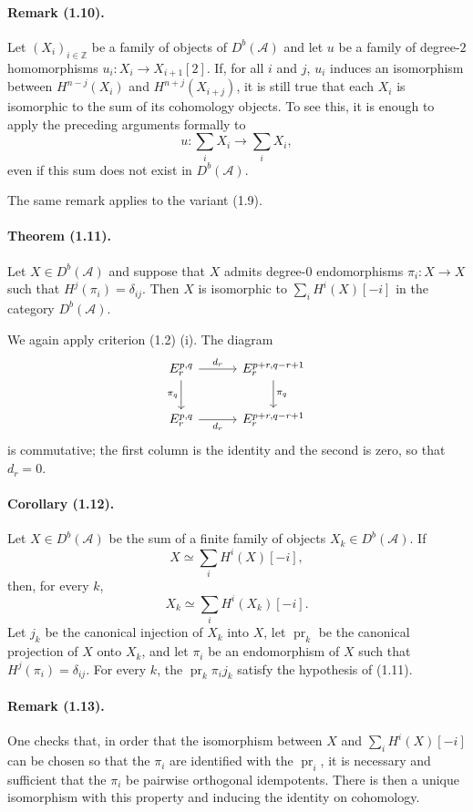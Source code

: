 \documentclass[10pt]{article}
\newcommand{\Acal}{\mathcal A}
\newcommand{\Z}{\mathbb Z}
\newcommand{\Db}{D^b}
\newcommand{\pr}{\operatorname{pr}}
\begin{document}
\paragraph{Remark (1.10).} Let $(X_i)_{i\in\Z}$ be a family of objects of $\Db(\Acal)$ and let $u$ be a family of degree-$2$ homomorphisms $u_i:X_i\to X_{i+1}[2]$. If, for all $i$ and $j$, $u_i$ induces an isomorphism between $H^{n-j}(X_i)$ and $H^{n+j}(X_{i+j})$, it is still true that each $X_i$ is isomorphic to the sum of its cohomology objects. To see this, it is enough to apply the preceding arguments formally to
\[
u:\sum_iX_i\longrightarrow\sum_iX_i,
\]
even if this sum does not exist in $\Db(\Acal)$.

The same remark applies to the variant (1.9).

\paragraph{Theorem (1.11).} Let $X\in\Db(\Acal)$ and suppose that $X$ admits degree-$0$ endomorphisms $\pi_i:X\to X$ such that $H^j(\pi_i)=\delta_{ij}$. Then $X$ is isomorphic to $\sum_iH^i(X)[-i]$ in the category $\Db(\Acal)$.

We again apply criterion (1.2) (i). The diagram
\[
\begin{tikzcd}[column sep=3.0em,row sep=2.2em]
E_r^{p,q} \arrow[r,"d_r"] \arrow[d,"\pi_q"'] & E_r^{p+r,q-r+1} \arrow[d,"\pi_q"]\\
E_r^{p,q} \arrow[r,"d_r"'] & E_r^{p+r,q-r+1}
\end{tikzcd}
\]
is commutative; the first column is the identity and the second is zero, so that $d_r=0$.

\paragraph{Corollary (1.12).} Let $X\in\Db(\Acal)$ be the sum of a finite family of objects $X_k\in\Db(\Acal)$. If
\[
X\simeq\sum_iH^i(X)[-i],
\]
then, for every $k$,
\[
X_k\simeq\sum_iH^i(X_k)[-i].
\]
Let $j_k$ be the canonical injection of $X_k$ into $X$, let $\pr_k$ be the canonical projection of $X$ onto $X_k$, and let $\pi_i$ be an endomorphism of $X$ such that $H^j(\pi_i)=\delta_{ij}$. For every $k$, the $\pr_k\pi_i j_k$ satisfy the hypothesis of (1.11).

\paragraph{Remark (1.13).} One checks that, in order that the isomorphism between $X$ and $\sum_iH^i(X)[-i]$ can be chosen so that the $\pi_i$ are identified with the $\pr_i$, it is necessary and sufficient that the $\pi_i$ be pairwise orthogonal idempotents. There is then a unique isomorphism with this property and inducing the identity on cohomology.
\end{document}
